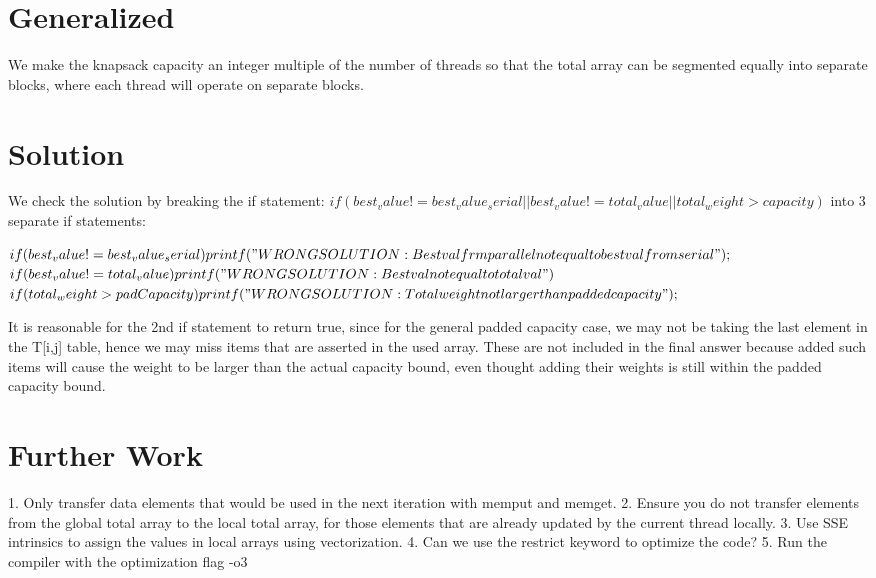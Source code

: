 \documentclass[11pt]{amsart}
\begin{document}
\section{Generalized}
We make the knapsack capacity an integer multiple of the number of threads so that the total array can be segmented equally into separate blocks, where each thread will operate on separate blocks.

\section{Solution}
We check the solution by breaking the if statement: 
$if( best_value != best_value_serial || best_value != total_value || total_weight > capacity )$
into 3 separate if statements:

$ if( best_value != best_value_serial ) printf( "WRONG SOLUTION: Best val frm parallel not equal to best val from serial" ); $
$ if( best_value != total_value ) printf("WRONG SOLUTION: Best val not equal to total val")$
$ if( total_weight > padCapacity ) printf( "WRONG SOLUTION: Total weight not larger than padded capacity" );$ 

It is reasonable for the 2nd if statement to return true, since for the general padded capacity case, we may not be taking the last element in the T[i,j] table, hence we may miss items that are asserted in the used array. These are not included in the final answer because added such items will cause the weight to be larger than the actual capacity bound, even thought adding their weights is still within the padded capacity bound.

\section{Further Work}
1. Only transfer data elements that would be used in the next iteration with memput and memget.
2. Ensure you do not transfer elements from the global total array to the local total array, for those elements that are already updated by the current thread locally.
3. Use SSE intrinsics to assign the values in local arrays using vectorization.
4. Can we use the restrict keyword to optimize the code? 
5. Run the compiler with the optimization flag -o3
\end{document}
